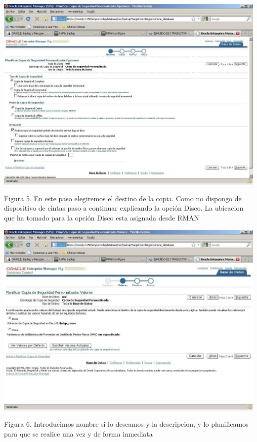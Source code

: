 \begin{enumerate}[1.]
	\begin{center}
	\includegraphics[width=15cm]{./Imagenes/eje1}
	\end{center}	
	Figura 5. En este paso elegiremos el destino de la copia. Como no dispongo de dispositivo de cintas paso a continuar explicando la opción Disco. La ubicacion que ha tomado para la opción  Disco  esta asignada desde RMAN
	\begin{center}
	\includegraphics[width=15cm]{./Imagenes/eje2}
	\end{center}
	Figura 6. Introducimos nombre si lo deseamos y la descripcion, y lo planificamos para que se realice una vez y de forma inmediata
	\begin{center}

\end{center}
\end{enumerate}
